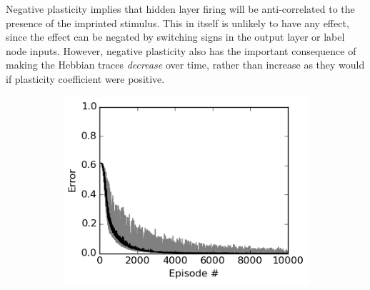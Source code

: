 \documentclass{article}
\begin{document}
Negative plasticity implies that hidden layer firing will be anti-correlated to
the presence of the imprinted stimulus. This in itself is unlikely to have any
effect, since the effect can be negated by switching signs in the output layer or label node inputs.
However, negative plasticity also has the important consequence of making the
Hebbian traces \emph{decrease} over time, rather than increase as they would if
plasticity coefficient were positive. 

\begin{figure}
\noindent
\begin{subfigure}[t]{0.35\textwidth}
\noindent
\includegraphics[scale=0.5]{figResultsReversal.png}
\end{subfigure}
\begin{subfigure}[t]{0.4\textwidth}
\centering
{}
\end{subfigure}
\end{figure}
\end{document}
